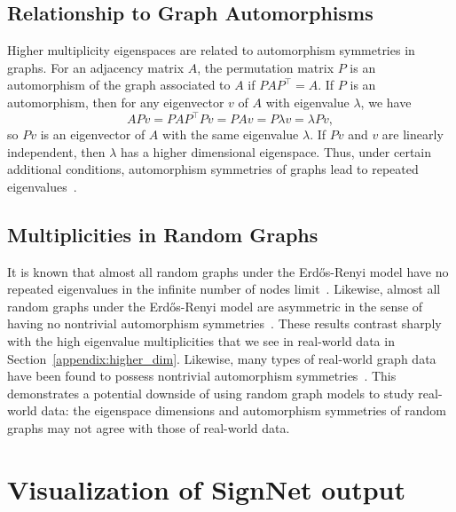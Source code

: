 \documentclass{article} \usepackage{iclr2023_conference,times}
\begin{document}
\subsection{Relationship to Graph Automorphisms}\label{appendix:automorphisms}

Higher multiplicity eigenspaces are related to automorphism symmetries in graphs. For an adjacency matrix $A$, the permutation matrix $P$ is an automorphism of the graph associated to $A$ if $PAP^\top = A$. If $P$ is an automorphism, then for any eigenvector $v$ of $A$ with eigenvalue $\lambda$, we have
\begin{equation}
    APv = PAP^\top P v = PAv = P\lambda v = \lambda Pv,
\end{equation}
so $Pv$ is an eigenvector of $A$ with the same eigenvalue $\lambda$. If $Pv$ and $v$ are linearly independent, then $\lambda$ has a higher dimensional eigenspace. Thus, under certain additional conditions, automorphism symmetries of graphs lead to repeated eigenvalues~\citep{sachs1983automorphism,teranishi2009eigenvalues}. 

\subsection{Multiplicities in Random Graphs}\label{appendix:random_graphs}

It is known that almost all random graphs under the Erd\H{o}s-Renyi model have no repeated eigenvalues in the infinite number of nodes limit~\citep{tao2017random}. Likewise, almost all random graphs under the Erd\H{o}s-Renyi model are asymmetric in the sense of having no nontrivial automorphism symmetries~\citep{erdos1963asymmetric}. These results contrast sharply with the high eigenvalue multiplicities that we see in real-world data in Section~\ref{appendix:higher_dim}. Likewise, many types of real-world graph data have been found to possess nontrivial automorphism symmetries~\citep{ball2018symmetric}. This demonstrates a potential downside of using random graph models to study real-world data: the eigenspace dimensions and automorphism symmetries of random graphs may not agree with those of real-world data.




\clearpage

\section{Visualization of SignNet output}\label{appendix:visualization}
\end{document}
